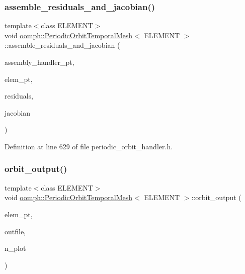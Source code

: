 \subsubsection{\texorpdfstring{assemble\+\_\+residuals\+\_\+and\+\_\+jacobian()}{assemble\_residuals\_and\_jacobian()}}
{\footnotesize\ttfamily template$<$class E\+L\+E\+M\+E\+NT$>$ \\
void \hyperlink{classoomph_1_1PeriodicOrbitTemporalMesh}{oomph\+::\+Periodic\+Orbit\+Temporal\+Mesh}$<$ E\+L\+E\+M\+E\+NT $>$\+::assemble\+\_\+residuals\+\_\+and\+\_\+jacobian (\begin{DoxyParamCaption}\item[{\hyperlink{classoomph_1_1PeriodicOrbitAssemblyHandlerBase}{Periodic\+Orbit\+Assembly\+Handler\+Base} $\ast$const \&}]{assembly\+\_\+handler\+\_\+pt,  }\item[{\hyperlink{classoomph_1_1GeneralisedElement}{Generalised\+Element} $\ast$const \&}]{elem\+\_\+pt,  }\item[{\hyperlink{classoomph_1_1Vector}{Vector}$<$ double $>$ \&}]{residuals,  }\item[{\hyperlink{classoomph_1_1DenseMatrix}{Dense\+Matrix}$<$ double $>$ \&}]{jacobian }\end{DoxyParamCaption})\hspace{0.3cm}{\ttfamily [inline]}}



Definition at line 629 of file periodic\+\_\+orbit\+\_\+handler.\+h.

\mbox{\label{classoomph_1_1PeriodicOrbitTemporalMesh_a8126152646e3eaed0ab5555794a20d49}} 
\subsubsection{\texorpdfstring{orbit\+\_\+output()}{orbit\_output()}}
{\footnotesize\ttfamily template$<$class E\+L\+E\+M\+E\+NT$>$ \\
void \hyperlink{classoomph_1_1PeriodicOrbitTemporalMesh}{oomph\+::\+Periodic\+Orbit\+Temporal\+Mesh}$<$ E\+L\+E\+M\+E\+NT $>$\+::orbit\+\_\+output (\begin{DoxyParamCaption}\item[{\hyperlink{classoomph_1_1GeneralisedElement}{Generalised\+Element} $\ast$const \&}]{elem\+\_\+pt,  }\item[{std\+::ostream \&}]{outfile,  }\item[{const unsigned \&}]{n\+\_\+plot }\end{DoxyParamCaption})\hspace{0.3cm}{\ttfamily [inline]}}



